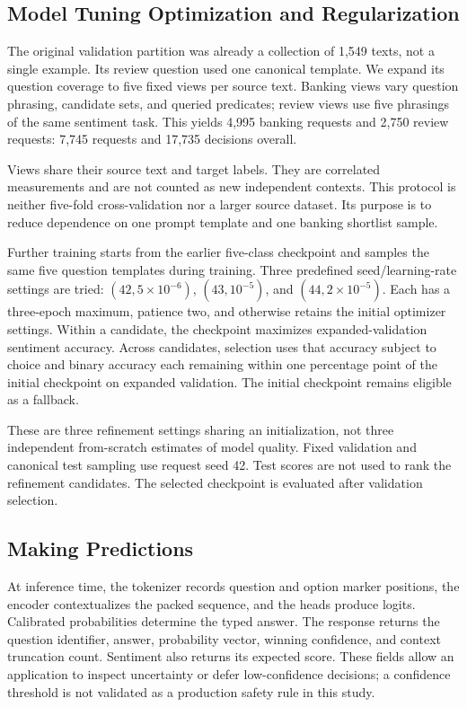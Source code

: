 \documentclass[conference]{IEEEtran}
\begin{document}
\subsection{Model Tuning Optimization and Regularization}
The original validation partition was already a collection of 1,549 texts, not a single example. Its review question used one canonical template. We expand its question coverage to five fixed views per source text. Banking views vary question phrasing, candidate sets, and queried predicates; review views use five phrasings of the same sentiment task. This yields 4,995 banking requests and 2,750 review requests: 7,745 requests and 17,735 decisions overall.

Views share their source text and target labels. They are correlated measurements and are not counted as new independent contexts. This protocol is neither five-fold cross-validation nor a larger source dataset. Its purpose is to reduce dependence on one prompt template and one banking shortlist sample.

Further training starts from the earlier five-class checkpoint and samples the same five question templates during training. Three predefined seed/learning-rate settings are tried: $(42,5\times10^{-6})$, $(43,10^{-5})$, and $(44,2\times10^{-5})$. Each has a three-epoch maximum, patience two, and otherwise retains the initial optimizer settings. Within a candidate, the checkpoint maximizes expanded-validation sentiment accuracy. Across candidates, selection uses that accuracy subject to choice and binary accuracy each remaining within one percentage point of the initial checkpoint on expanded validation. The initial checkpoint remains eligible as a fallback.

These are three refinement settings sharing an initialization, not three independent from-scratch estimates of model quality. Fixed validation and canonical test sampling use request seed 42. Test scores are not used to rank the refinement candidates. The selected checkpoint is evaluated after validation selection.


\subsection{Making Predictions}
At inference time, the tokenizer records question and option marker positions, the encoder contextualizes the packed sequence, and the heads produce logits. Calibrated probabilities determine the typed answer. The response returns the question identifier, answer, probability vector, winning confidence, and context truncation count. Sentiment also returns its expected score. These fields allow an application to inspect uncertainty or defer low-confidence decisions; a confidence threshold is not validated as a production safety rule in this study.
\end{document}
